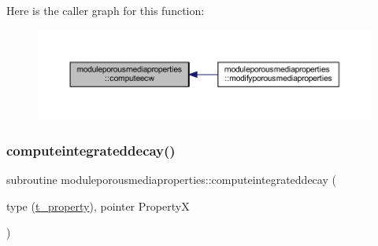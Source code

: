 Here is the caller graph for this function\+:\nopagebreak
\begin{figure}[H]
\begin{center}
\leavevmode
\includegraphics[width=350pt]{namespacemoduleporousmediaproperties_a32b1336499ea5a5ca4e733054acee536_icgraph}
\end{center}
\end{figure}
\mbox{\label{namespacemoduleporousmediaproperties_a06f48331cb6d7a1d7fa1520565129efc}} 
\subsubsection{\texorpdfstring{computeintegrateddecay()}{computeintegrateddecay()}}
{\footnotesize\ttfamily subroutine moduleporousmediaproperties\+::computeintegrateddecay (\begin{DoxyParamCaption}\item[{type (\mbox{\hyperlink{structmoduleporousmediaproperties_1_1t__property}{t\+\_\+property}}), pointer}]{PropertyX }\end{DoxyParamCaption})\hspace{0.3cm}{\ttfamily [private]}}

